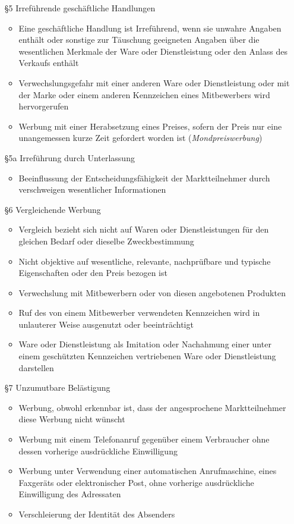 \begin{itemize}
\begin{enumerate}
			\end{enumerate}
	\item[§5] Irreführende geschäftliche Handlungen
		\begin{itemize}
			\item Eine geschäftliche Handlung ist Irreführend, wenn sie unwahre Angaben enthält oder sonstige zur Täuschung geeigneten Angaben über die wesentlichen Merkmale der Ware oder Dienstleistung oder den Anlass des Verkaufs enthält
			\item Verwechslungsgefahr mit einer anderen Ware oder Dienstleistung oder mit der Marke oder einem anderen Kennzeichen eines Mitbewerbers wird hervorgerufen
			\item Werbung mit einer Herabsetzung eines Preises, sofern der Preis nur eine unangemessen kurze Zeit gefordert worden ist ({\it Mondpreiswerbung})
		\end{itemize}
	\item[§5a] Irreführung durch Unterlassung
		\begin{itemize}
			\item Beeinflussung der Entscheidungsfähigkeit der Marktteilnehmer durch verschweigen wesentlicher Informationen
		\end{itemize}
	\item[§6] Vergleichende Werbung
		\begin{itemize}
			\item Vergleich bezieht sich nicht auf Waren oder Dienstleistungen für den gleichen Bedarf oder dieselbe Zweckbestimmung
			\item Nicht objektive auf wesentliche, relevante, nachprüfbare und typische Eigenschaften oder den Preis bezogen ist
			\item Verwechslung mit Mitbewerbern oder von diesen angebotenen Produkten
			\item Ruf des von einem Mitbewerber verwendeten Kennzeichen wird in unlauterer Weise ausgenutzt oder beeinträchtigt
			\item Ware oder Dienstleistung als Imitation oder Nachahmung einer unter einem geschützten Kennzeichen vertriebenen Ware oder Dienstleistung darstellen
		\end{itemize}
	\item[§7] Unzumutbare Belästigung
		\begin{itemize}
			\item Werbung, obwohl erkennbar ist, dass der angesprochene Marktteilnehmer diese Werbung nicht wünscht
			\item Werbung mit einem Telefonanruf gegenüber einem Verbraucher ohne dessen vorherige ausdrückliche Einwilligung
			\item Werbung unter Verwendung einer automatischen Anrufmaschine, eines Faxgeräts oder elektronischer Post, ohne vorherige ausdrückliche Einwilligung des Adressaten
			\item Verschleierung der Identität des Absenders
		\end{itemize}
\end{itemize}

